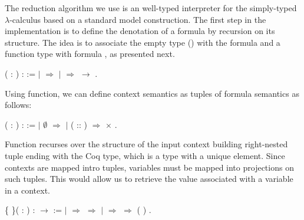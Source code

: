 The reduction algorithm we use is an well-typed interpreter for the simply-typed $\lambda$-calculus based on a
standard model construction. The first step in the implementation is to define the denotation of a formula by
recursion on its structure. The idea is to associate the empty type () with the formula  and a
function type with formula   , as presented next.
 \begin{coqdoccode}
\coqdocemptyline
\coqdocemptyline
\coqdocnoindent
{}  ( : \coqdocvar{$\alpha$}) :  :=\coqdoceol
\coqdocindent{1.00em}
  \coqdoceol
\coqdocindent{1.00em}
\ensuremath{|}  \ensuremath{\Rightarrow} \coqdoceol
\coqdocindent{1.00em}
\ensuremath{|}    \ensuremath{\Rightarrow}   \ensuremath{\rightarrow}  \coqdoceol
\coqdocindent{1.00em}
.\coqdoceol
\coqdocemptyline
\end{coqdoccode}
Using  function, we can define context semantics as tuples
of formula semantics as follows:
 \begin{coqdoccode}
\coqdocemptyline
\coqdocnoindent
{}  ( : \coqdocvar{$\Gamma$}) :  :=\coqdoceol
\coqdocindent{1.00em}
  \coqdoceol
\coqdocindent{1.00em}
\ensuremath{|} $\emptyset$ \ensuremath{\Rightarrow} \coqdoceol
\coqdocindent{1.00em}
\ensuremath{|} ( :: ) \ensuremath{\Rightarrow}   \ensuremath{\times}  \coqdoceol
\coqdocindent{1.00em}
.\coqdoceol
\end{coqdoccode}
Function  recurses over the structure of the input context building
right-nested tuple ending with the Coq  type, which is a type with a
unique element. Since contexts are mapped intro tuples, variables must be
mapped into projections on such tuples. This would allow us to retrieve the
value associated with a variable in a context.
\begin{coqdoccode}
\coqdocemptyline
\coqdocnoindent
{}  \{ \}( :   )\coqdoceol
\coqdocindent{1.00em}
:   \ensuremath{\rightarrow}   :=\coqdoceol
\coqdocindent{2.00em}
  \coqdoceol
\coqdocindent{2.00em}
\ensuremath{|}  \ensuremath{\Rightarrow}   \ensuremath{\Rightarrow}  \coqdoceol
\coqdocindent{2.00em}
\ensuremath{|}   \ensuremath{\Rightarrow}   \ensuremath{\Rightarrow}   ( )\coqdoceol
\coqdocindent{2.00em}
.\coqdoceol
\coqdocemptyline
\end{coqdoccode}
